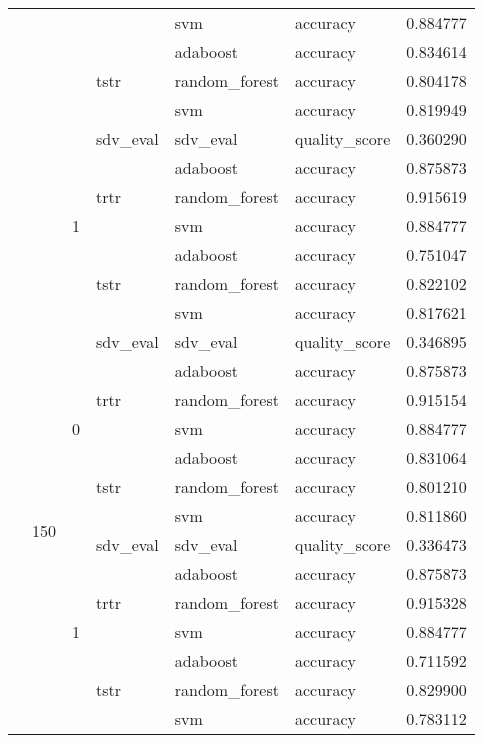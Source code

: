 \begin{longtable}{llllllr}
\cline{5-7}
 &  &  &  & svm & accuracy & 0.884777 \\
\cline{4-7} \cline{5-7}
 &  &  & \multirow[t]{3}{*}{tstr} & adaboost & accuracy & 0.834614 \\
\cline{5-7}
 &  &  &  & random_forest & accuracy & 0.804178 \\
\cline{5-7}
 &  &  &  & svm & accuracy & 0.819949 \\
\cline{3-7} \cline{4-7} \cline{5-7}
 &  & \multirow[t]{7}{*}{1} & sdv_eval & sdv_eval & quality_score & 0.360290 \\
\cline{4-7} \cline{5-7}
 &  &  & \multirow[t]{3}{*}{trtr} & adaboost & accuracy & 0.875873 \\
\cline{5-7}
 &  &  &  & random_forest & accuracy & 0.915619 \\
\cline{5-7}
 &  &  &  & svm & accuracy & 0.884777 \\
\cline{4-7} \cline{5-7}
 &  &  & \multirow[t]{3}{*}{tstr} & adaboost & accuracy & 0.751047 \\
\cline{5-7}
 &  &  &  & random_forest & accuracy & 0.822102 \\
\cline{5-7}
 &  &  &  & svm & accuracy & 0.817621 \\
\cline{2-7} \cline{3-7} \cline{4-7} \cline{5-7}
 & \multirow[t]{14}{*}{150} & \multirow[t]{7}{*}{0} & sdv_eval & sdv_eval & quality_score & 0.346895 \\
\cline{4-7} \cline{5-7}
 &  &  & \multirow[t]{3}{*}{trtr} & adaboost & accuracy & 0.875873 \\
\cline{5-7}
 &  &  &  & random_forest & accuracy & 0.915154 \\
\cline{5-7}
 &  &  &  & svm & accuracy & 0.884777 \\
\cline{4-7} \cline{5-7}
 &  &  & \multirow[t]{3}{*}{tstr} & adaboost & accuracy & 0.831064 \\
\cline{5-7}
 &  &  &  & random_forest & accuracy & 0.801210 \\
\cline{5-7}
 &  &  &  & svm & accuracy & 0.811860 \\
\cline{3-7} \cline{4-7} \cline{5-7}
 &  & \multirow[t]{7}{*}{1} & sdv_eval & sdv_eval & quality_score & 0.336473 \\
\cline{4-7} \cline{5-7}
 &  &  & \multirow[t]{3}{*}{trtr} & adaboost & accuracy & 0.875873 \\
\cline{5-7}
 &  &  &  & random_forest & accuracy & 0.915328 \\
\cline{5-7}
 &  &  &  & svm & accuracy & 0.884777 \\
\cline{4-7} \cline{5-7}
 &  &  & \multirow[t]{3}{*}{tstr} & adaboost & accuracy & 0.711592 \\
\cline{5-7}
 &  &  &  & random_forest & accuracy & 0.829900 \\
\cline{5-7}
 &  &  &  & svm & accuracy & 0.783112 \\
\cline{1-7} \cline{2-7} \cline{3-7} \cline{4-7} \cline{5-7}
\end{longtable}
